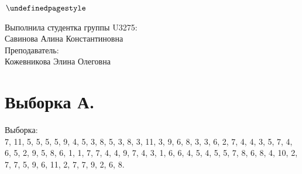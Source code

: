 \documentclass[12pt]{article}
\begin{document}
\pagestyle{fancy}
$\thispagestyle{first style}$


\vspace{25mm}


\vspace{50mm}

\begin{flushright}
Выполнила студентка группы U3275:\\Савинова Алина Константиновна\\
\vspace{5mm}
Преподаватель:\\Кожевникова Элина Олеговна\\
\end{flushright}

\newpage

\pagestyle{empty}
\raggedright
\section*{Выборка А.}
Выборка: \\
7, 11, 5, 5, 5, 5, 9, 4, 5, 3, 8, 5, 3, 8, 3,
11, 3, 9, 6, 8, 3, 3, 6, 2, 7, 4, 4, 3, 5, 7,
4, 6, 5, 2, 9, 5, 8, 6, 1, 1, 7, 7, 4, 4, 9,
7, 4, 3, 1, 6, 6, 4, 5, 4, 5, 5, 7, 8, 6, 8,
4, 10, 2, 7, 7, 5, 9, 6, 11, 2, 7, 7, 9, 2, 6, 8.
\end{document}
